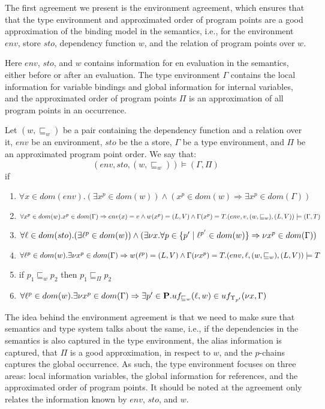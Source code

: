 \documentclass[acmsmall,sigplan]{acmart}
\begin{document}
The first agreement we present is the environment agreement, which ensures that that the type environment and approximated order of program points are a good approximation of the binding model in the semantics, i.e., 
for the environment $env$, store $sto$, dependency function $w$, and the relation of program points over $w$.

Here $env$, $sto$, and $w$ contains information for en evaluation in the semantics, either before or after an evaluation.
The type environment $\Gamma$ contains the local information for variable bindings and global information for internal variables, and the approximated order of program points $\Pi$ is an approximation of all program points in an occurrence.

\begin{definition}\label{def:EnvAgree}
	Let $(w,\sqsubseteq_w)$ be a pair containing the dependency function and a relation over it, $env$ be an environment, $sto$ be the a store, $\Gamma$ be a type environment, and $\Pi$ be an approximated program point order.
	We say that:
	$$(env,sto,(w,\sqsubseteq_w))\models(\Gamma,\Pi)$$
	if 
	\begin{enumerate}
		\item $\forall x\in dom(env).(\exists x^p\in dom(w))\wedge(x^p\in dom(w)\Rightarrow \exists x^p\in dom(\Gamma))$
		\item $\forall x^p\in dom(w).x^p\in dom(\Gamma)\Rightarrow env(x)=v\wedge w(x^p)=(L,V)\wedge\Gamma(x^p)=T.\\(env,v,(w,\sqsubseteq_w),(L,V))\models (\Gamma,T)$
		\item $\forall \ell\in dom(sto).(\exists \ell^p\in dom(w))\wedge(\exists \nu x.\forall p\in\{p'\mid\ell^{p'}\in dom(w)\}\Rightarrow\nu x^p\in dom(\Gamma))$
		\item $\forall \ell^p \in dom(w).\exists\nu x^{p}\in dom(\Gamma)\Rightarrow w(\ell^p)=(L,V)\wedge\Gamma(\nu x^{p})=T.(env,\ell,(w,\sqsubseteq_w),(L,V))\models T$
		\item if $p_1\sqsubseteq_w p_2$ then $p_1\sqsubseteq_\Pi p_2$
	\item $\forall \ell^p\in dom(w).\exists \nu x^p\in dom(\Gamma)\Rightarrow\exists p'\in\textbf{P}.uf_{\sqsubseteq_w}(\ell,w)\in uf_{\Upsilon_{p'}}(\nu x,\Gamma)$
	\end{enumerate}
\end{definition}
The idea behind the environment agreement is that we need to make sure that semantics and type system talks about the same, i.e., if the dependencies in the semantics is also captured in the type environment, the alias information is captured, 
that $\Pi$ is a good approximation, in respect to $w$, and the $p$-chains captures the global occurrence.
As such, the type environment focuses on three areas:  local information variables,  the global information for references, and  the approximated order of program points.
It should be noted at the agreement only relates the information known by $env$, $sto$, and $w$.
\end{document}
